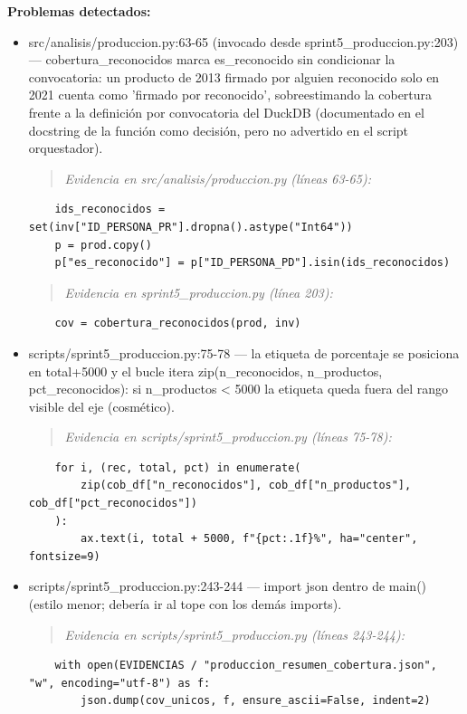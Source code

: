 \begin{tcolorbox}[riesgo]
\textbf{Problemas detectados:}
\begin{itemize}
  \item src/analisis/produccion.py:63-65 (invocado desde sprint5\_produccion.py:203) --- cobertura\_reconocidos marca es\_reconocido sin condicionar la convocatoria: un producto de 2013 firmado por alguien reconocido solo en 2021 cuenta como 'firmado por reconocido', sobreestimando la cobertura frente a la definición por convocatoria del DuckDB (documentado en el docstring de la función como decisión, pero no advertido en el script orquestador).
\begin{quote}\footnotesize\ttfamily
\noindent\emph{Evidencia en src/analisis/produccion.py (líneas 63-65):}
\end{quote}
\begin{lstlisting}
    ids_reconocidos = set(inv["ID_PERSONA_PR"].dropna().astype("Int64"))
    p = prod.copy()
    p["es_reconocido"] = p["ID_PERSONA_PD"].isin(ids_reconocidos)
\end{lstlisting}

\begin{quote}\footnotesize\ttfamily
\noindent\emph{Evidencia en sprint5\_produccion.py (línea 203):}
\end{quote}
\begin{lstlisting}
    cov = cobertura_reconocidos(prod, inv)
\end{lstlisting}

  \item scripts/sprint5\_produccion.py:75-78 --- la etiqueta de porcentaje se posiciona en total+5000 y el bucle itera zip(n\_reconocidos, n\_productos, pct\_reconocidos): si n\_productos < 5000 la etiqueta queda fuera del rango visible del eje (cosmético).
\begin{quote}\footnotesize\ttfamily
\noindent\emph{Evidencia en scripts/sprint5\_produccion.py (líneas 75-78):}
\end{quote}
\begin{lstlisting}
    for i, (rec, total, pct) in enumerate(
        zip(cob_df["n_reconocidos"], cob_df["n_productos"], cob_df["pct_reconocidos"])
    ):
        ax.text(i, total + 5000, f"{pct:.1f}%", ha="center", fontsize=9)
\end{lstlisting}

  \item scripts/sprint5\_produccion.py:243-244 --- import json dentro de main() (estilo menor; debería ir al tope con los demás imports).
\begin{quote}\footnotesize\ttfamily
\noindent\emph{Evidencia en scripts/sprint5\_produccion.py (líneas 243-244):}
\end{quote}
\begin{lstlisting}
    with open(EVIDENCIAS / "produccion_resumen_cobertura.json", "w", encoding="utf-8") as f:
        json.dump(cov_unicos, f, ensure_ascii=False, indent=2)
\end{lstlisting}


\end{itemize}
\end{tcolorbox}
